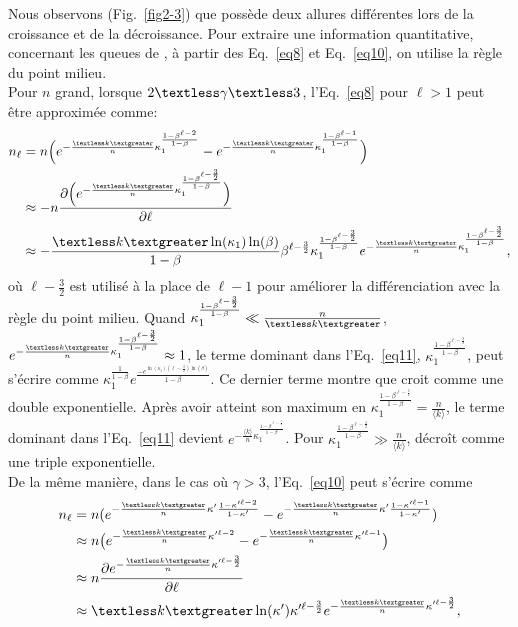 Nous observons (Fig.~\ref{fig2-3}) que \nl possède deux allures différentes lors de la croissance et de la décroissance. Pour extraire une information quantitative, concernant les queues de \nl, à partir des Eq.~\eqref{eq8} et Eq.~\eqref {eq10}, on utilise la règle du point milieu. \\
Pour $n$ grand, lorsque $2\textless \gamma \textless 3$, l'Eq.~\eqref{eq8} pour $\ell>1$ peut être approximée comme:
\begin{align}
n_{\ell}&=n\Big(e^{-\frac{\km}{n}\kappa_1^{\frac{1-\beta^{\ell-2}}{1-\beta}}}-e^{-\frac{\km}{n}\kappa_1^{\frac{1-\beta^{\ell-1}}{1-\beta}}}\Big) \nonumber \\
&\approx -n \frac{\partial \Big(e^{-\frac{\km}{n}\kappa_1^{\frac{1-\beta^{\ell-\frac{3}{2}}}{1-\beta}}} \Big) }{\partial \ell} \nonumber \\
&\approx -\frac {\km \ln(\kappa_1) \ln(\beta)} {1-\beta} \beta^{\ell-\frac{3}{2}} \kappa_1^{\frac{1-\beta^{\ell-\frac{3}{2}}}{1-\beta}}e^{-\frac{\km}{n}\kappa_1^{\frac{1-\beta^{\ell-\frac{3}{2}}}{1-\beta}}}, 
\label{eq11}
\end{align}
où $ \ell-\frac{3}{2} $ est utilisé à la place de $ \ell-1$ pour améliorer la différenciation avec la règle du point milieu. Quand $\kappa_1^{\frac{1-\beta^{\ell-\frac{3}{2}}}{1-\beta}}\ll\frac{n}{\km}$,  $e^{-\frac{\km}{n}\kappa_1^{\frac{1-\beta^{\ell-\frac{3}{2}}}{1-\beta}}}\approx 1$, le terme dominant dans l'Eq.~\eqref{eq11}, $\kappa_1^{\frac{1-\beta^{\ell-\frac{3}{2}}}{1-\beta}}$, peut s'écrire comme $\kappa_1^{\frac{1}{1-\beta}}e^{\frac{-e^{\ln(\kappa_1)(\ell-\frac{3}{2})\ln(\beta)}}{1-\beta}}$. Ce dernier terme montre que \nl croit comme une double exponentielle. Après avoir atteint son maximum en $\kappa_1^{\frac{1-\beta^{\ell-\frac{3}{2}}}{1-\beta}}=\frac{n}{\langle k \rangle}$, le terme dominant dans l'Eq.~\ref{eq11} devient 
$e^{-\frac{\langle k \rangle}{n}\kappa_1^{\frac{1-\beta^{\ell-\frac{3}{2}}}{1-\beta}}}$. Pour $\kappa_1^{\frac{1-\beta^{\ell-\frac{3}{2}}}{1-\beta}}\gg \frac{n}{\langle k \rangle}$, \nl décroît comme une triple exponentielle. \\
De la même manière, dans le cas où $\gamma>3$, l'Eq.~\eqref{eq10} peut s'écrire comme
\begin{align}
n_{\ell}&= n(e^{-\frac{\textless k \textgreater}{n}\kappa'\frac{1-\kappa'^{\ell-2}}{1-\kappa'}}-e^{-\frac{\km}{n}\kappa'\frac{1-\kappa'^{\ell-1}}{1-\kappa'}})\nonumber\\
&\approx n\big(e^{-\frac{\km}{n}\kappa'^{\ell-2}}-e^{-\frac{\km}{n}\kappa'^{\ell-1}}\big)\nonumber\\
&\approx n\frac{\partial e^{-\frac{\km}{n}\kappa'^{\ell-\frac{3}{2}}}}{\partial \ell}\nonumber\\
&\approx\km\ln(\kappa')\kappa'^{\ell-\frac{3}{2}}e^{-\frac{\km}{n}\kappa'^{\ell-\frac{3}{2}}},
\end{align}
